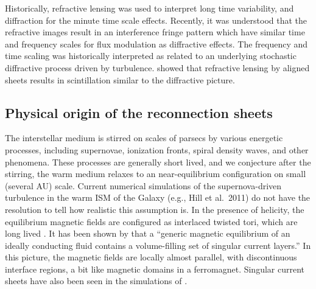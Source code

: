 \documentclass[useAMS,usenatbib]{mn2e}
\begin{document}
Historically, refractive lensing was used to interpret long time
variability, and diffraction for the minute time scale
effects. Recently, it was understood that the refractive images result
in an interference fringe pattern\cite{2004MNRAS.354...43W} which have
similar time and frequency scales for flux modulation as diffractive
effects.  The frequency and time scaling was historically interpreted
as related to an underlying stochastic diffractive process driven by
turbulence.
\cite{2006ApJ...640L.159G} showed that refractive lensing by aligned
sheets  results in
scintillation similar to the diffractive picture.







\subsection{Physical origin of the reconnection sheets}

The interstellar medium is stirred on scales of parsecs by various
energetic processes, including supernovae, ionization fronts, spiral
density waves, and other phenomena.  These processes are generally
short lived, and we conjecture after the stirring, the warm medium
relaxes to an near-equilibrium configuration on small (several AU)
scale. Current numerical simulations of the supernova-driven
turbulence in the warm ISM of the Galaxy (e.g., Hill et al.~2011) do
not have the resolution to tell how realistic this assumption is.  In
the presence of helicity, the equilibrium magnetic fields are
configured as interlaced twisted tori, which are long lived
\citep{2004Natur.431..819B}.  It has been shown by \citep{2009arXiv0909.1815G}
that a ``generic magnetic equilibrium of an ideally conducting fluid
contains a volume-filling set of singular current layers.'' In this
picture, the magnetic fields are locally almost parallel, with
discontinuous interface regions, a bit like magnetic domains in a
ferromagnet. Singular current sheets have also been seen in the
simulations of \citep{2004PhRvL..92h4504S}.
\end{document}
